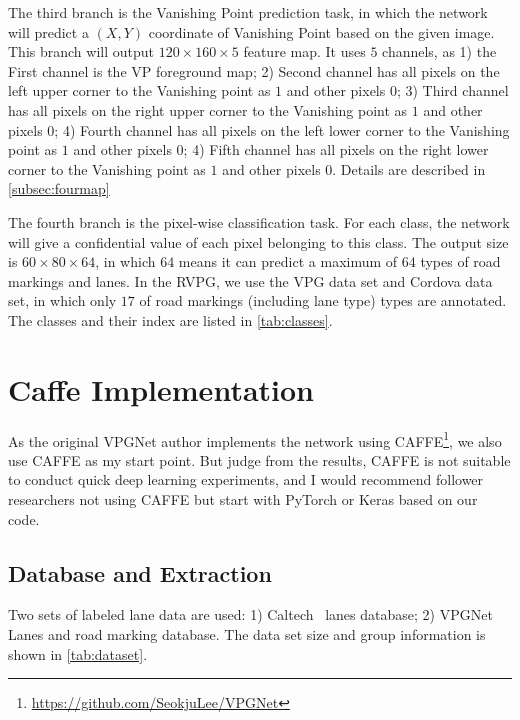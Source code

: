 \begin{spacing}{1.5}
The third branch is the Vanishing Point prediction task, in which the network will predict a $(X, Y)$ coordinate of Vanishing Point based on the given image. This branch will output $120 \times 160 \times 5$ feature map. It uses $5$ channels, as 1) the First channel is the VP foreground map; 2) Second channel has all pixels on the left upper corner to the Vanishing point as $1$ and other pixels $0$; 3) Third channel has all pixels on the right upper corner to the Vanishing point as $1$ and other pixels $0$; 4) Fourth channel has all pixels on the left lower corner to the Vanishing point as $1$ and other pixels $0$; 4) Fifth channel has all pixels on the right lower corner to the Vanishing point as $1$ and other pixels $0$. Details are described in \autoref{subsec:fourmap}

The fourth branch is the pixel-wise classification task. For each class, the network will give a confidential value of each pixel belonging to this class. The output size is $60 \times 80 \times 64$, in which $64$ means it can predict a maximum of $64$ types of road markings and lanes. In the RVPG, we use the VPG data set and Cordova data set, in which only $17$ of road markings (including lane type) types are annotated. The classes and their index are listed in \autoref{tab:classes}.

\section{Caffe Implementation}
\label{sec:MD_CAFFE}

As the original VPGNet author implements the network using CAFFE\footnote{\url{https://github.com/SeokjuLee/VPGNet}}, we also use CAFFE as my start point. But judge from the results, CAFFE is not suitable to conduct quick deep learning experiments, and I would recommend follower researchers not using CAFFE but start with PyTorch or Keras based on our code.


\subsection{Database and Extraction}

Two sets of labeled lane data are used: 1) Caltech~\cite{caltech} lanes database; 2) VPGNet~\cite{lee2017vpgnet} Lanes and road marking database. The data set size and group information is shown in \autoref{tab:dataset}. 


\end{spacing}
